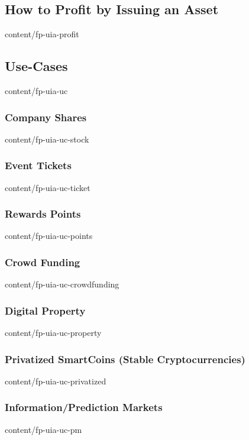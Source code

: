 \documentclass[conference,final,10pt,a4paper]{IEEEtran}
\begin{document}
\subsection    { How to Profit by Issuing an Asset               }  { content/fp-uia-profit          } 
\subsection    { Use-Cases                                       }  { content/fp-uia-uc              } 
\subsubsection { Company Shares                                  }  { content/fp-uia-uc-stock        } 
\subsubsection { Event Tickets                                   }  { content/fp-uia-uc-ticket       } 
\subsubsection { Rewards Points                                  }  { content/fp-uia-uc-points       } 
\subsubsection { Crowd Funding                                   }  { content/fp-uia-uc-crowdfunding } 
\subsubsection { Digital Property                                }  { content/fp-uia-uc-property     } 
\subsubsection { Privatized SmartCoins (Stable Cryptocurrencies) }  { content/fp-uia-uc-privatized   } 
\subsubsection { Information/Prediction Markets                  }  { content/fp-uia-uc-pm           } 
\end{document}
